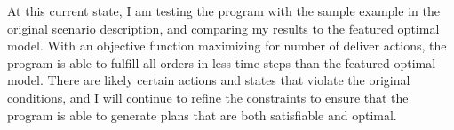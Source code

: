 \documentclass[letterpaper]{article}
\begin{document}
At this current state, I am testing the program with the sample example in the original scenario description, and comparing my results to the featured optimal model. With an objective function maximizing for number of deliver actions, the program is able to fulfill all orders in less time steps than the featured optimal model. There are likely certain actions and states that violate the original conditions, and I will continue to refine the constraints to ensure that the program is able to generate plans that are both satisfiable and optimal.

\nocite{erdem2021asp}
\nocite{DBLP:journals/aim/KaufmannLPS16}

\begin{quote}
    \begin{small}
        
        
    \end{small}
\end{quote}
\end{document}
